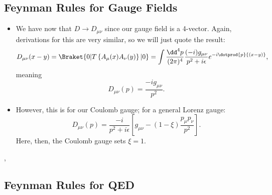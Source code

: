 \subsection*{Feynman Rules for Gauge Fields}

\begin{itemize}
    \item We have now that $D \rightarrow D_{\mu\nu}$ since our gauge field is a 4-vector. Again, derivations for this are very similar, so we will just quote the result:
        \begin{equation*}
            D_{\mu\nu}(x-y) = \Braket{0 | T\left\{ A_{\mu}(x)A_{\nu}(y) \right\} | 0} = \int \frac{\dd^4p}{(2\pi)^4} \frac{(-i)g_{\mu\nu}}{p^2 + i\epsilon}e^{-i\dotprod{p}{(x-y)}},
        \end{equation*}
        meaning
        \begin{equation*}
            D_{\mu\nu}(p) = \frac{-ig_{\mu\nu}}{p^2}.
        \end{equation*}
    \item However, this is for our Coulomb gauge; for a general Lorenz gauge:
        \begin{equation*}
            D_{\mu\nu}(p) = \frac{-i}{p^2+i\epsilon}\left[ g_{\mu\nu} -(1-\xi)\frac{p_{\mu}p_{\nu}}{p^2} \right].
        \end{equation*}
        Here, then, the Coulomb gauge sets $\xi=1$.
\end{itemize}

\sep




\subsection*{Feynman Rules for QED}

